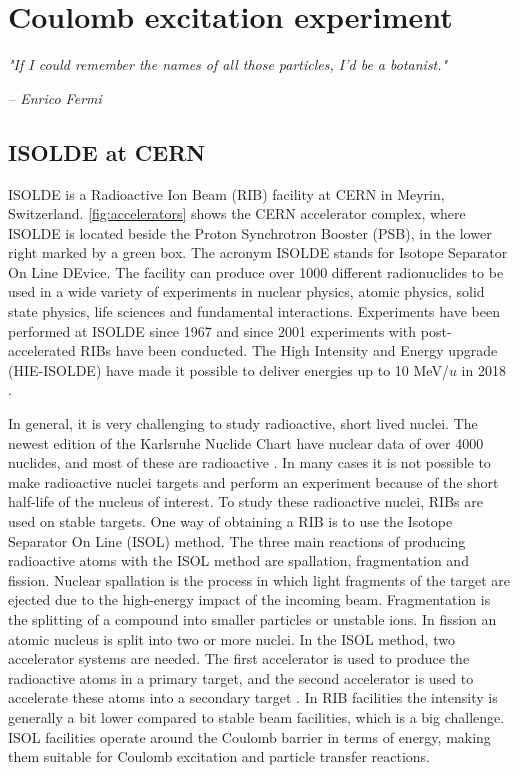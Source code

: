 \documentclass[twoside,english]{uiofysmaster/uiofysmaster}
\let\orgautoref\autoref
\renewcommand{\autoref}
        {%
		 \def\subsectionautorefname{Section}%
		 \def\subsubsectionautorefname{Section}%
          \orgautoref}
\begin{document}
\chapter{Coulomb excitation experiment}
\epigraph{\textit{"If I could remember the names of all those particles, I'd be a botanist."}}{\textit{– Enrico Fermi}}

\section{ISOLDE at CERN}
ISOLDE is a Radioactive Ion Beam (RIB) facility at CERN in Meyrin, Switzerland. \autoref{fig:accelerators} shows the CERN accelerator complex, where ISOLDE is located beside the Proton Synchrotron Booster (PSB), in the lower right marked by a green box. The acronym ISOLDE stands for Isotope Separator On Line DEvice. The facility can produce over 1000 different radionuclides to be used in a wide variety of experiments in nuclear physics, atomic physics, solid state physics, life sciences and fundamental interactions. Experiments have been performed at ISOLDE since 1967 and since 2001 experiments with post-accelerated RIBs have been conducted. The High Intensity and Energy upgrade (HIE-ISOLDE) have made it possible to deliver energies up to 10 MeV/$u$ in 2018 \cite{HIE-ISOLDE, ISOLDE-web, ISOLDE-facility}. 

In general, it is very challenging to study radioactive, short lived nuclei. 
The newest edition of the Karlsruhe Nuclide Chart have nuclear data of over 4000 nuclides, and most of these are radioactive \cite{CoN}. 
In many cases it is not possible to make radioactive nuclei targets and perform an experiment because of the short half-life of the nucleus of interest. 
To study these radioactive nuclei, RIBs are used on stable targets. 
One way of obtaining a RIB is to use the Isotope Separator On Line (ISOL) method. 
The three main reactions of producing radioactive atoms with the ISOL method are spallation, fragmentation and fission. 
Nuclear spallation is the process in which light fragments of the target are ejected due to the high-energy impact of the incoming beam. 
Fragmentation is the splitting of a compound into smaller particles or unstable ions. 
In fission an atomic nucleus is split into two or more nuclei.
In the ISOL method, two accelerator systems are needed. 
The first accelerator is used to produce the radioactive atoms in a primary target, and the second accelerator is used to accelerate these atoms into a secondary target \cite{ISOLDE-web, Lindroos, ISOL}. 
In RIB facilities the intensity is generally a bit lower compared to stable beam facilities, which is a big challenge. 
ISOL facilities operate around the Coulomb barrier in terms of energy, making them suitable for Coulomb excitation and particle transfer reactions. 
\end{document}
